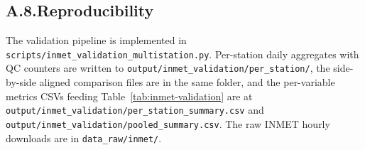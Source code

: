 \subsection*{A.8.\quad Reproducibility}

The validation pipeline is implemented in
\verb|scripts/inmet_validation_multistation.py|. Per-station daily
aggregates with QC counters are written to
\verb|output/inmet_validation/per_station/|, the side-by-side aligned
comparison files are in the same folder, and the per-variable
metrics CSVs feeding Table~\ref{tab:inmet-validation} are at
\verb|output/inmet_validation/per_station_summary.csv| and
\verb|output/inmet_validation/pooled_summary.csv|.
The raw INMET hourly downloads are in \verb|data_raw/inmet/|.

